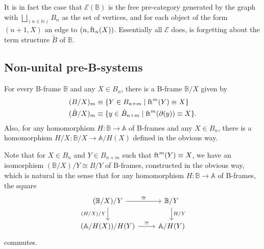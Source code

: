 \begin{rmk} 
It is in fact the case that $\mathcal{E}(\mathbb{B})$ is the free pre-category generated by the
graph with $\bigsqcup_{(n\in\mathbb{N})}B_n$ as the set of vertices, and
for each object of the form $(n+1,X)$ an edge to $(n,\eft[n](X))$. 
Essentially all $\mathcal{E}$ does, is forgetting about the term structure 
$\tilde{B}$ of $\mathbb{B}$.
%
\end{rmk}

\subsection{Non-unital pre-B-systems}

For every B-frame $\mathbb{B}$ and any $X\in B_n$, there is a B-frame
$\mathbb{B}/X$ given by
\begin{align*}
(B/X)_{m} & \jdeq \{Y\in B_{n+m}\mid\eft^{m}(Y)\jdeq X\}\\
(\tilde{B}/X)_m & \jdeq \{y\in \tilde{B}_{n+m}\mid\eft^m(\ebd(y))\jdeq X\}.
\end{align*}
Also, for any homomorphism $H:\mathbb{B}\to\mathbb{A}$ of B-frames and any
$X\in B_n$, there is a homomorphism $H/X:\mathbb{B}/X\to\mathbb{A}/H(X)$
defined in the obvious way.

Note that for $X\in B_n$ and $Y\in B_{n+m}$ such that $\eft^m(Y)\jdeq X$, 
we have an isomorphism $(\mathbb{B}/X)/Y\cong B/Y$ of B-frames, constructed in the obvious way, which is natural in the sense that for any homomorphism $H:\mathbb{B}\to\mathbb{A}$ of B-frames, the square
\begin{equation*}
\begin{tikzcd}
(\mathbb{B}/X)/Y \arrow[r,"\cong"] \arrow[d,swap,"(H/X)/Y"] &  \mathbb{B}/Y \arrow[d,"H/Y"] \\
(\mathbb{A}/H(X))/H(Y) \arrow[r,"\cong"] & \mathbb{A}/H(Y)
\end{tikzcd}
\end{equation*}
commutes.

